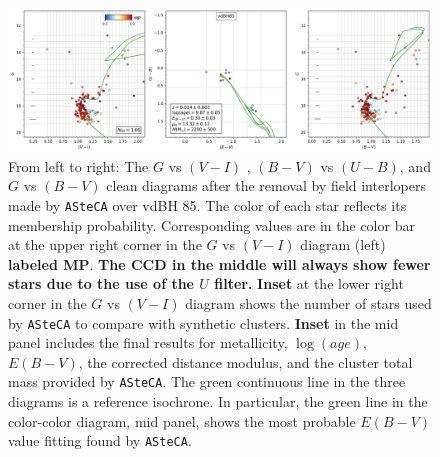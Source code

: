 \documentclass[referee]{aa}
\begin{document}
\begin{figure}[ht]
    \centering
    \includegraphics[width=\hsize]{../figs/cmds_vdBH85.png}
\caption{From left to right: The $G$ vs $(V-I)$ , $(B-V)$ vs $(U-B)$,
and $G$ vs $(B-V)$ clean diagrams after the removal by field interlopers
made by \texttt{ASteCA} over vdBH 85. The color of each star reflects
its membership probability. Corresponding values are in the color bar at
the upper right corner in the $G$ vs $(V-I)$ diagram (left) \textbf{labeled
MP}. \textbf{The CCD in the middle will always show fewer stars due to the
use of the $U$ filter.}
\textbf{Inset} at the lower right corner in the $G$ vs $(V-I)$ diagram shows
the number of stars used by \texttt{ASteCA} to compare with synthetic clusters.
\textbf{Inset} in the mid panel includes the final
results for metallicity, $\log(age)$, $E(B-V)$, the corrected distance
modulus, and the cluster total mass provided by \texttt{ASteCA}. The green
continuous line in the three diagrams is a reference isochrone. In
particular, the green line in the color-color diagram, mid panel, shows the
most probable $E(B-V)$ value fitting found by \texttt{ASteCA}.
}
    \label{fig:fundpars_vdBH85}
\end{figure}
\end{document}
